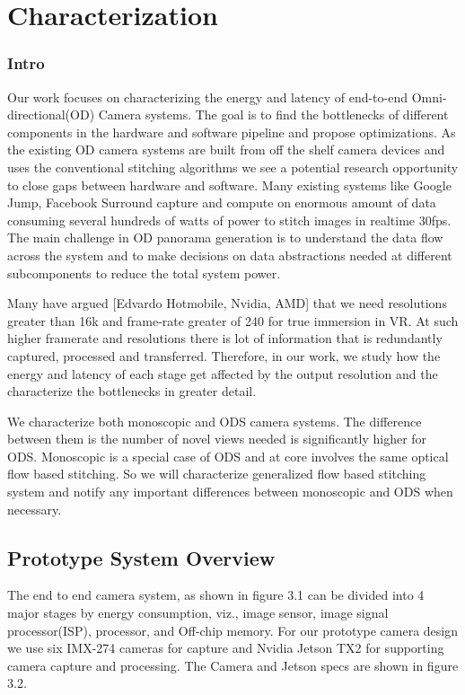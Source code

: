 \chapter{Characterization}

\subsection{Intro}
Our work focuses on characterizing the energy and latency of end-to-end Omni-directional(OD) Camera  systems. The goal is to find the bottlenecks of different components in the hardware and software pipeline and propose optimizations. As the existing OD camera systems are built from off the shelf camera devices and uses the conventional stitching algorithms we see a potential research opportunity to close gaps between hardware and software. Many existing systems like Google Jump, Facebook Surround capture and compute on enormous amount of data consuming several hundreds of watts of power to stitch images in realtime 30fps. The main challenge in OD panorama generation is to understand the data flow across the system and to make decisions on data abstractions needed at different subcomponents to reduce the total system power.

Many have argued [Edvardo Hotmobile, Nvidia, AMD] that we need resolutions greater than 16k and frame-rate greater of 240 for true immersion in VR. At such higher framerate and resolutions there is lot of information that is redundantly captured, processed and transferred. Therefore, in our work, we study how the energy and latency of each stage get affected by the output resolution and the characterize the bottlenecks in greater detail. 

We characterize both monoscopic and ODS camera systems. The difference between them is the number of novel views needed is significantly higher for ODS. Monoscopic is a special case of ODS and at core involves the same optical flow based stitching. So we will characterize generalized flow based stitching system and notify any important differences between monoscopic and ODS when necessary.\newline

\section{Prototype System Overview}

The end to end camera system, as shown in figure 3.1 can be divided into 4 major stages by energy consumption, viz., image sensor, image signal processor(ISP), processor, and Off-chip memory. For our prototype camera design we use six IMX-274 cameras for capture and Nvidia Jetson TX2 for supporting camera capture and processing. The Camera and Jetson specs are shown in figure 3.2. 

